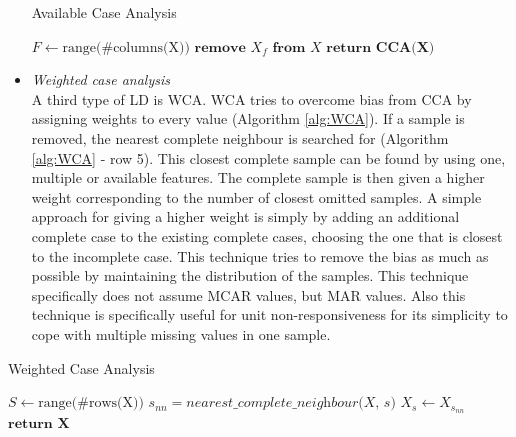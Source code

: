 \documentclass[10pt,a4paper]{article}
\begin{document}
\begin{itemize}
	\begin{algorithm}[H]
		\caption{Available Case Analysis}\label{alg:ACA}
		\begin{algorithmic}[1]
			\State $F \gets \text{range(\#columns(X))}$ 	
			 					
			 				 			
			\State $\textbf{remove } X_f \textbf{ from } X$ 				
			\EndIf
			\EndFor
			\State $\textbf{return CCA(X)}$
			\EndProcedure
		\end{algorithmic}
	\end{algorithm}	
	
	\item \textit{Weighted case analysis} \\
	A third type of LD is WCA. WCA tries to overcome bias from CCA by assigning 
	weights to every value (Algorithm \ref{alg:WCA}). If a sample is removed, 
	the nearest complete neighbour is searched for (Algorithm \ref{alg:WCA} -  
	row 5). This closest complete sample can be found by using one, multiple or 
	available features. The complete sample is then given a higher weight 
	corresponding to the number of closest omitted samples. A simple approach 
	for giving a higher weight is simply by adding an additional complete case 
	to the existing complete cases, choosing the one that is closest to the 
	incomplete case. This technique tries to remove the bias as much as 
	possible by maintaining the distribution of the samples. This technique 
	specifically does not assume MCAR values, but MAR 
	values\cite{haukoos2007advanced, donders2006gentle}. Also this 
	technique is specifically useful for unit non-responsiveness for its 
	simplicity to cope with multiple missing values in one 
	sample\cite{patrician2002multiple}.
	\end{itemize}
	
	\begin{algorithm}[H]
		\caption{Weighted Case Analysis}\label{alg:WCA}
		\begin{algorithmic}[1]
			\State $S \gets \text{range(\#rows(X))}$ 	
			 					
			 				 			
			\State $s_{nn} = \textit{nearest\_complete\_neighbour(X, s)}$	
			\State $ X_s \gets X_{s_{nn}}$ 				
			\EndIf
			\EndFor
			\State $\textbf{return X}$
			\EndProcedure
		\end{algorithmic}
	\end{algorithm}	
	
\end{document}
